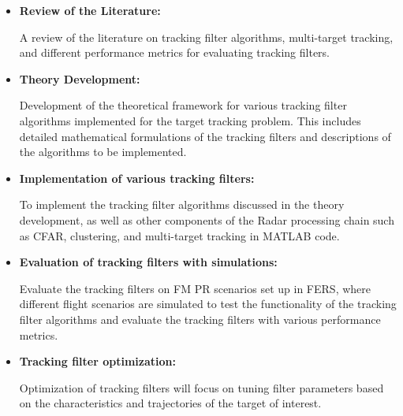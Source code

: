 \begin{itemize}
    \item \textbf{Review of the Literature:} 
    
    A review of the literature on tracking filter algorithms, multi-target tracking, and different performance metrics for evaluating tracking filters.
    \item \textbf{Theory Development:}
    
    Development of the theoretical framework for various tracking filter algorithms implemented for the target tracking problem. This includes detailed mathematical formulations of the tracking filters and descriptions of the algorithms to be implemented.

    \item \textbf{Implementation of various tracking filters:}
    
    To implement the tracking filter algorithms discussed in the theory development, as well as other components of the \ac{Radar} processing chain such as \ac{CFAR}, clustering, and multi-target tracking in MATLAB code.

    \item \textbf{Evaluation of tracking filters with simulations:}
    
    Evaluate the tracking filters on FM \ac{PR} scenarios set up in \ac{FERS}, where different flight scenarios are simulated to test the functionality of the tracking filter algorithms and evaluate the tracking filters with various performance metrics.

    \item \textbf{Tracking filter optimization:}
    
    Optimization of tracking filters will focus on tuning filter parameters based on the characteristics and trajectories of the target of interest. 

\end{itemize}
